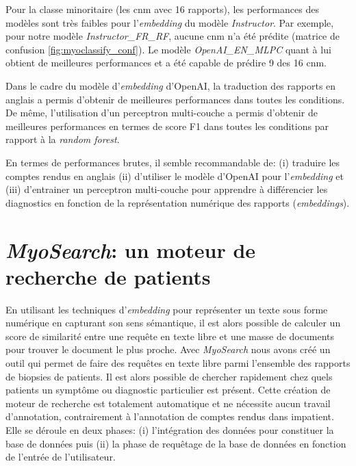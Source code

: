 Pour la classe minoritaire (les \gls{cnm} avec 16 rapports), les performances des modèles sont très faibles pour l'\textit{embedding} du modèle \textit{Instructor}. Par exemple, pour notre modèle \textit{Instructor\_FR\_RF}, aucune \gls{cnm} n'a été prédite (matrice de confusion \ref{fig:myoclassify_conf}). Le modèle \textit{OpenAI\_EN\_MLPC} quant à lui obtient de meilleures performances et a été capable de prédire 9 des 16 \gls{cnm}. 

Dans le cadre du modèle d'\textit{embedding} d'OpenAI, la traduction des rapports en anglais a permis d'obtenir de meilleures performances dans toutes les conditions. De même, l'utilisation d'un perceptron multi-couche a permis d'obtenir de meilleures performances en termes de score F1 dans toutes les conditions par rapport à la \textit{random forest}.

En termes de performances brutes, il semble recommandable de: (i) traduire les comptes rendus en anglais (ii) d'utiliser le modèle d'OpenAI pour l'\textit{embedding} et (iii) d'entrainer un perceptron multi-couche pour apprendre à différencier les diagnostics en fonction de la représentation numérique des rapports (\textit{embeddings}).

\section{\textit{MyoSearch}: un moteur de recherche de patients}
En utilisant les techniques d'\textit{embedding} pour représenter un texte sous forme numérique en capturant son sens sémantique, il est alors possible de calculer un score de similarité entre une requête en texte libre et une masse de documents pour trouver le document le plus proche. Avec \textit{MyoSearch} nous avons créé un outil qui permet de faire des requêtes en texte libre parmi l'ensemble des rapports de biopsies de patients. Il est alors possible de chercher rapidement chez quels patients un symptôme ou diagnostic particulier est présent. Cette création de moteur de recherche est totalement automatique et ne nécessite aucun travail d'annotation, contrairement à l'annotation de comptes rendus dans \gls{impatient}. Elle se déroule en deux phases: (i) l'intégration des données pour constituer la base de données puis (ii) la phase de requêtage de la base de données en fonction de l'entrée de l'utilisateur.

